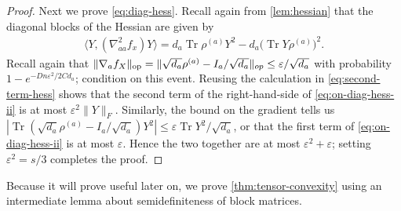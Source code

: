 \documentclass[aos]{imsart}
\theoremstyle{definition}
\DeclareMathOperator{\op}{op}
\DeclareMathOperator{\tr}{Tr}
\DeclarePairedDelimiter{\norm}{\lVert}{\rVert}
\newcommand{\eps}{\varepsilon}
\newcommand{\samp}{x}
\newcommand{\rv}{X}
\begin{document}
\begin{proof}
Next we prove \cref{eq:diag-hess}. Recall again from \cref{lem:hessian} that the diagonal blocks of the Hessian are given by \begin{align}
 \langle Y,  \left( \nabla^2_{aa} f_{\samp} \right) Y \rangle=  d_a \tr \rho^{(a)} Y^2 - d_a \bigl(\tr Y \rho^{(a)}\bigr)^2.\label{eq:on-diag-hess-ii}
\end{align}
Recall again that $\norm{\nabla_a f_{\rv}}_{\op} = \|\sqrt{d_a} \rho^{(a)} - I_a/\sqrt{d_a}\|_{op} \leq \eps/\sqrt{d_a}$ with probability $1 - e^{-D n \eps^2/2Cd_a}$; condition on this event. Reusing the calculation in \cref{eq:second-term-hess} shows that the second term of the right-hand-side of \cref{eq:on-diag-hess-ii} is at most $\eps^2\|Y\|_F.$ Similarly, the bound on the gradient tells us $ |\tr (\sqrt{d_a} \rho^{(a)}  - I_a/\sqrt{d_a})Y^2| \leq \eps \tr Y^2/\sqrt{d_a}$, or that the first term of \cref{eq:on-diag-hess-ii} is at most $\eps$. Hence the two together are at most $\eps^2 + \eps$; setting $\eps^2 = s/3$ completes the proof.
\end{proof}
 Because it will prove useful later on, we prove \cref{thm:tensor-convexity} using an intermediate lemma about semidefiniteness of block matrices.
\end{document}
